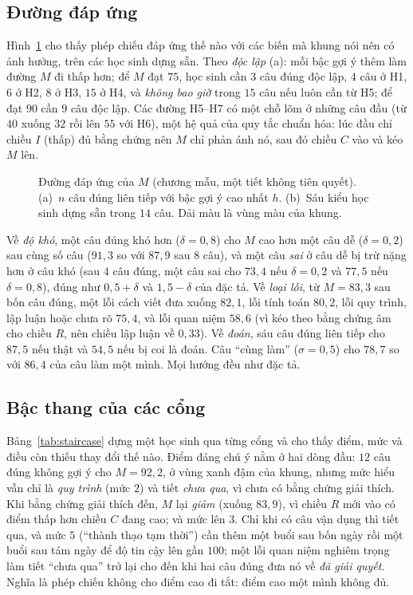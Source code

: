 \subsection{Đường đáp ứng}\label{sec:curves}
Hình~\ref{fig:curves} cho thấy phép chiếu đáp ứng thế nào với các biến mà khung nói nên có ảnh hưởng, trên các học sinh dựng sẵn. Theo \emph{độc lập} (a): mỗi bậc gợi ý thêm làm đường $M$ đi thấp hơn; để $M$ đạt $75$, học sinh cần $3$ câu đúng độc lập, $4$ câu ở H1, $6$ ở H2, $8$ ở H3, $15$ ở H4, và \emph{không bao giờ} trong $15$ câu nếu luôn cần từ H5; để đạt $90$ cần $9$ câu độc lập. Các đường H5--H7 có một chỗ lõm ở những câu đầu (từ $40$ xuống $32$ rồi lên $55$ với H6), một hệ quả của quy tắc chuẩn hóa: lúc đầu chỉ chiều $I$ (thấp) đủ bằng chứng nên $M$ chỉ phản ánh nó, sau đó chiều $C$ vào và kéo $M$ lên.

\begin{figure}[tp]
\centering

\caption{Đường đáp ứng của $M$ (chương mẫu, một tiết không tiên quyết). (a)~$n$ câu đúng liên tiếp với bậc gợi ý cao nhất $h$. (b)~Sáu kiểu học sinh dựng sẵn trong $14$ câu. Dải màu là vùng màu của khung.}
\label{fig:curves}
\end{figure}

Về \emph{độ khó}, một câu đúng khó hơn ($\delta=0{,}8$) cho $M$ cao hơn một câu dễ ($\delta=0{,}2$) sau cùng số câu ($91{,}3$ so với $87{,}9$ sau $8$ câu), và một câu \emph{sai} ở câu dễ bị trừ nặng hơn ở câu khó (sau $4$ câu đúng, một câu sai cho $73{,}4$ nếu $\delta=0{,}2$ và $77{,}5$ nếu $\delta=0{,}8$), đúng như $0{,}5+\delta$ và $1{,}5-\delta$ của đặc tả. Về \emph{loại lỗi}, từ $M=83{,}3$ sau bốn câu đúng, một lỗi cách viết đưa xuống $82{,}1$, lỗi tính toán $80{,}2$, lỗi quy trình, lập luận hoặc chưa rõ $75{,}4$, và lỗi quan niệm $58{,}6$ (vì kéo theo bằng chứng âm cho chiều $R$, nên chiều lập luận về $0{,}33$). Về \emph{đoán}, sáu câu đúng liên tiếp cho $87{,}5$ nếu thật và $54{,}5$ nếu bị coi là đoán. Câu ``cùng làm'' ($\sigma=0{,}5$) cho $78{,}7$ so với $86{,}4$ của câu làm một mình. Mọi hướng đều như đặc tả.

\subsection{Bậc thang của các cổng}\label{sec:staircase}
Bảng~\ref{tab:staircase} dựng một học sinh qua từng cổng và cho thấy điểm, mức và điều còn thiếu thay đổi thế nào. Điểm đáng chú ý nằm ở hai dòng đầu: $12$ câu đúng không gợi ý cho $M=92{,}2$, ở vùng xanh đậm của khung, nhưng mức hiểu vẫn chỉ là \emph{quy trình} (mức $2$) và tiết \emph{chưa qua}, vì chưa có bằng chứng giải thích. Khi bằng chứng giải thích đến, $M$ lại \emph{giảm} (xuống $83{,}9$), vì chiều $R$ mới vào có điểm thấp hơn chiều $C$ đang cao; và mức lên $3$. Chỉ khi có câu vận dụng thì tiết qua, và mức $5$ (``thành thạo tạm thời'') cần thêm một buổi sau bốn ngày rồi một buổi sau tám ngày để độ tin cậy lên gần $100$; một lỗi quan niệm nghiêm trọng làm tiết ``chưa qua'' trở lại cho đến khi hai câu đúng đưa nó về \emph{đã giải quyết}. Nghĩa là phép chiếu không cho điểm cao đi tắt: điểm cao một mình không đủ.

